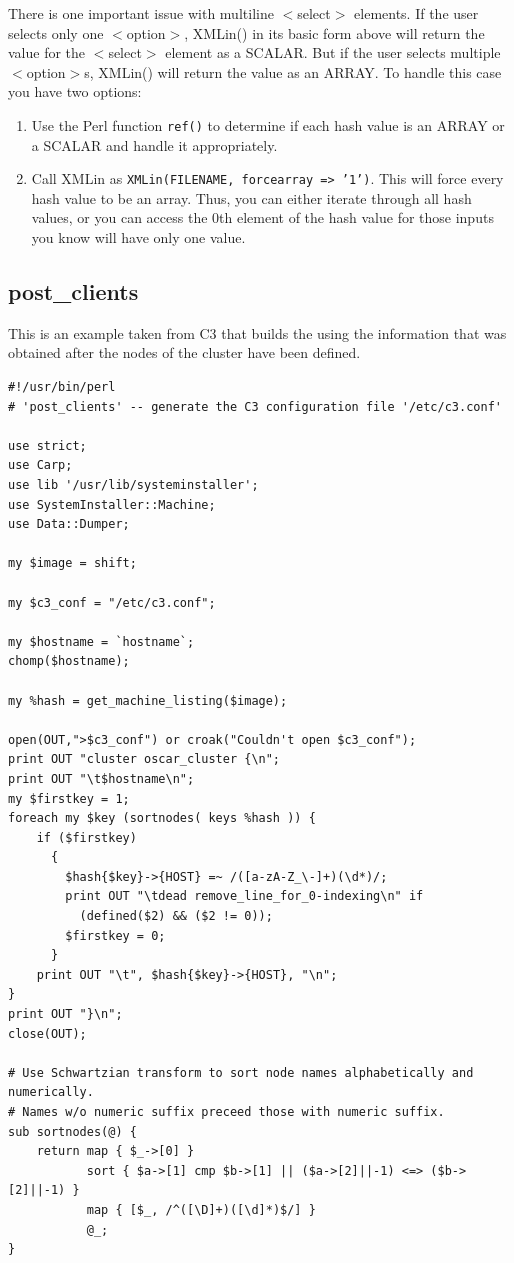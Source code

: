 There is one important issue with multiline $<$select$>$ elements.  If the
user selects only one $<$option$>$, XMLin() in its basic form above will
return the value for the $<$select$>$ element as a SCALAR.  But if the user
selects multiple $<$option$>$s, XMLin() will return the value as an ARRAY.
To handle this case you have two options:

\begin{enumerate}
\item Use the Perl function \texttt{ref()} to determine if each hash value is
an ARRAY or a SCALAR and handle it appropriately.  
\item Call XMLin as \texttt{XMLin(FILENAME, forcearray => '1')}.  This will
force every hash value to be an array.  Thus, you can either iterate through
all hash values, or you can access the 0th element of the hash value for
those inputs you know will have only one value.
\end{enumerate}



\subsection{post\_clients}

This is an example taken from C3 that builds the  using
the information that was obtained after the nodes of the cluster have been
defined. 
\begin{scriptsize}
\begin{verbatim}
#!/usr/bin/perl
# 'post_clients' -- generate the C3 configuration file '/etc/c3.conf'

use strict;
use Carp;
use lib '/usr/lib/systeminstaller';
use SystemInstaller::Machine;
use Data::Dumper;

my $image = shift;

my $c3_conf = "/etc/c3.conf";

my $hostname = `hostname`;
chomp($hostname);

my %hash = get_machine_listing($image);

open(OUT,">$c3_conf") or croak("Couldn't open $c3_conf");
print OUT "cluster oscar_cluster {\n";
print OUT "\t$hostname\n";
my $firstkey = 1;
foreach my $key (sortnodes( keys %hash )) {
    if ($firstkey)
      {
        $hash{$key}->{HOST} =~ /([a-zA-Z_\-]+)(\d*)/;
        print OUT "\tdead remove_line_for_0-indexing\n" if 
          (defined($2) && ($2 != 0));
        $firstkey = 0;
      }
    print OUT "\t", $hash{$key}->{HOST}, "\n";
}
print OUT "}\n";
close(OUT);

# Use Schwartzian transform to sort node names alphabetically and numerically.
# Names w/o numeric suffix preceed those with numeric suffix.
sub sortnodes(@) {
	return map { $_->[0] }
	       sort { $a->[1] cmp $b->[1] || ($a->[2]||-1) <=> ($b->[2]||-1) }
	       map { [$_, /^([\D]+)([\d]*)$/] }
	       @_;
}
\end{verbatim}
\end{scriptsize}


